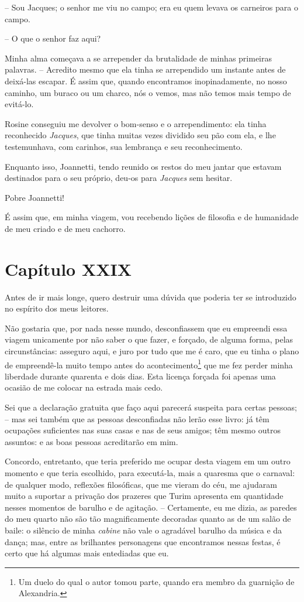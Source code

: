  -- Sou Jacques; o senhor me viu no campo; era eu quem levava os
carneiros para o campo.

 -- O que o senhor faz aqui?

 Minha alma começava a se arrepender da brutalidade de minhas primeiras
palavras. -- Acredito mesmo que ela tinha se arrependido um instante
antes de deixá-las escapar. É assim que, quando encontramos
inopinadamente, no nosso caminho, um buraco ou um charco, nós o vemos,
mas não temos mais tempo de evitá-lo.

 Rosine conseguiu me devolver o bom-senso e o arrependimento: ela tinha
reconhecido \textit{Jacques}, que tinha muitas vezes dividido seu pão
com ela, e lhe testemunhava, com carinhos, sua lembrança e seu
reconhecimento.

 Enquanto isso, Joannetti, tendo reunido os restos do meu jantar que
estavam destinados para o seu próprio, deu-os para \textit{Jacques} sem
hesitar.

 Pobre Joannetti!

 É assim que, em minha viagem, vou recebendo lições de filosofia e de
humanidade de meu criado e de meu cachorro.

\section{Capítulo XXIX}

 Antes de ir mais longe, quero destruir uma dúvida que poderia ter se
introduzido no espírito dos meus leitores. 

 Não gostaria que, por nada nesse mundo, desconfiassem que eu empreendi
essa viagem unicamente por não saber o que fazer, e forçado, de alguma
forma, pelas circunstâncias: asseguro aqui, e juro por tudo que me é
caro, que eu tinha o plano de empreendê-la muito tempo antes do
acontecimento\footnote{ Um duelo do qual o autor tomou parte, quando
era membro da guarnição de Alexandria.}  que me fez perder minha
liberdade durante quarenta e dois dias. Esta licença forçada foi apenas
uma ocasião de me colocar na estrada mais cedo.

 Sei que a declaração gratuita que faço aqui parecerá suspeita para
certas pessoas; -- mas sei também que as pessoas desconfiadas não
lerão esse livro: já têm ocupações suficientes nas suas casas e nas de
seus amigos; têm mesmo outros assuntos: e as boas pessoas acreditarão
em mim.

 Concordo, entretanto, que teria preferido me ocupar desta viagem em um
outro momento e que teria escolhido, para executá-la, mais a quaresma
que o carnaval: de qualquer modo, reflexões filosóficas, que me vieram
do céu, me ajudaram muito a suportar a privação dos prazeres que Turim
apresenta em quantidade nesses momentos de barulho e de agitação. --
Certamente, eu me dizia, as paredes do meu quarto não são tão
magnificamente decoradas quanto as de um salão de baile: o silêncio de
minha \textit{cabine} não vale o agradável barulho da música e da
dança; mas, entre as brilhantes personagens que encontramos nessas
festas, é certo que há algumas mais entediadas que eu. 

